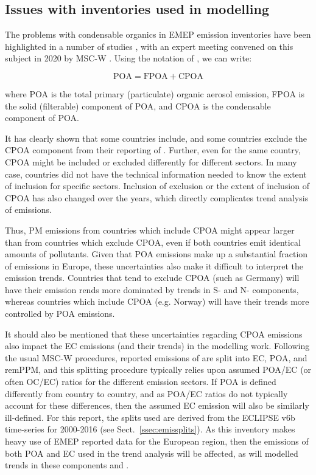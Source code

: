 \subsection{Issues with inventories used in modelling}
\label{ss:IssuesECOC}


The problems with condensable organics in EMEP emission
inventories have been highlighted in a number of studies
\citep{DeniervanderGon2015,R2015:SVOC,TFMM2018,R2019:SVOC,R2020:CAMSREF2,R2020:SVOC},
with an expert meeting convened on this subject in 2020 by MSC-W
\citep{CONDws2020}. Using the notation of \citep{CONDws2020}, we can
write:


\begin{equation}
  \mbox{POA} = \mbox{FPOA} + \mbox{CPOA}
\end{equation}

where POA is the total primary (particulate) organic aerosol emission, FPOA
is the solid (filterable)  component of POA, and CPOA is the condensable
component of POA.

It has clearly shown that some countries include, and some countries
exclude the CPOA component from their reporting of \pmfine. Further, even
for the same country, CPOA might be included or excluded differently for
different sectors. In many case, countries did not have the technical
information needed to know the extent of inclusion for specific
sectors. Inclusion of exclusion or the extent of inclusion of CPOA has
also changed over the years, which directly complicates trend analysis
of emissions. 

Thus, PM emissions from countries which include CPOA might appear
larger than from countries which exclude CPOA, even if both countries
emit identical amounts of pollutants. Given that POA emissions make up a
substantial fraction of \pmfine emissions in Europe, these uncertainties
also make it difficult to interpret the emission trends. Countries that
tend to exclude CPOA (such as Germany) will have their \pmfine emission
rends more dominated by trends in S- and N- components, whereas countries
which include CPOA (e.g. Norway) will have their trends more controlled
by POA emissions.


It should also be mentioned that these uncertainties regarding CPOA
emissions also impact the EC emissions (and their trends) in the
modelling work. Following the usual MSC-W procedures, reported emissions
of \pmfine are split into EC, POA, and remPPM, and this splitting
procedure typically relies upon assumed POA/EC (or often OC/EC) ratios for the different
emission sectors. If POA is defined differently from country to country,
and as POA/EC ratios do not typically account for these differences,
then the assumed EC emission will also be similarly ill-defined. For this report, the
splits used are derived from the ECLIPSE v6b time-series for 2000-2016
(see Sect.~\ref{ssec:emissplits}). As this inventory makes heavy use of
EMEP reported data for the European region, then the emissions of both POA and EC used in the trend analysis will be affected, as will modelled trends in these components and \pmfine.


